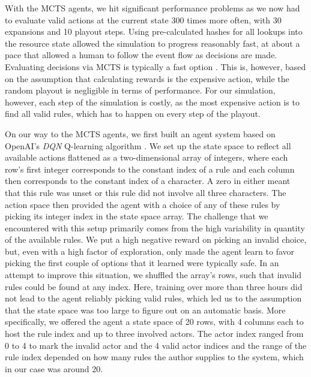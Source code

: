 With the MCTS agents, we hit significant performance problems as we now had to evaluate valid actions at the current state 300 times more often, with 30 expansions and 10 playout steps. Using pre-calculated hashes for all lookups into the resource state allowed the simulation to progress reasonably fast, at about a pace that allowed a human to follow the event flow as decisions are made. Evaluating decisions via MCTS is typically a fast option \cite{mcts_survey}. This is, however, based on the assumption that calculating rewards is the expensive action, while the random playout is negligible in terms of performance. For our simulation, however, each step of the simulation is costly, as the most expensive action is to find all valid rules, which has to happen on every step of the playout.

On our way to the MCTS agents, we first built an agent system based on OpenAI's \emph{DQN} Q-learning algorithm \cite{baselines}. We set up the state space to reflect all available actions flattened as a two-dimensional array of integers, where each row's first integer corresponds to the constant index of a rule and each column then corresponds to the constant index of a character. A zero in either meant that this rule was unset or this rule did not involve all three characters. The action space then provided the agent with a choice of any of these rules by picking its integer index in the state space array. The challenge that we encountered with this setup primarily comes from the high variability in quantity of the available rules. We put a high negative reward on picking an invalid choice, but, even with a high factor of exploration, only made the agent learn to favor picking the first couple of options that it learned were typically safe. In an attempt to improve this situation, we shuffled the array's rows, such that invalid rules could be found at any index. Here, training over more than three hours did not lead to the agent reliably picking valid rules, which led us to the assumption that the state space was too large to figure out on an automatic basis. More specifically, we offered the agent a state space of 20 rows, with 4 columns each to host the rule index and up to three involved actors. The actor index ranged from 0 to 4 to mark the invalid actor and the 4 valid actor indices and the range of the rule index depended on how many rules the author supplies to the system, which in our case was around 20.

